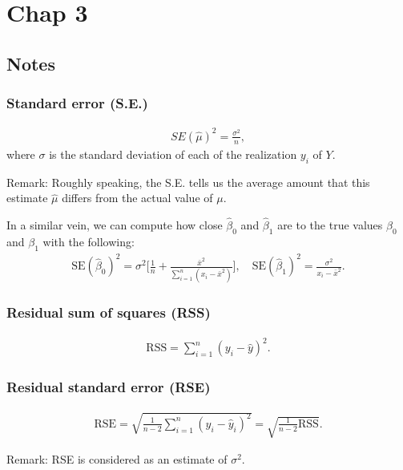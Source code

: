 \section{Chap 3}
\subsection{Notes}
\subsubsection{Standard error (S.E.)}
\begin{align}
SE(\hat{\mu})^2 = \frac{\sigma^2}{n},
\end{align}
where $\sigma$ is the standard deviation of each of the realization $y_i$ of $Y$. 
\begin{tbox}
Remark: Roughly speaking, the S.E. tells us the average amount that this estimate $\hat{\mu}$ differs from the actual value of $\mu$.
\end{tbox}
In a similar vein, we can compute how close $\hat{\beta}_0$ and $\hat{\beta}_1$ are to the true values $\beta_0$ and $\beta_1$ with the following:
\begin{align}
\text{SE}(\hat{\beta}_0)^2 = \sigma^2\bigg[\frac{1}{n} + \frac{\bar{x}^2}{\sum_{i=1}^n(x_i-\bar{x}^2)}\bigg],\quad \text{SE}(\hat{\beta}_1)^2 = \frac{\sigma^2}{x_i-\bar{x}^2}.
\end{align}
\subsubsection{Residual sum of squares (RSS)}
\begin{align}
\text{RSS} = \sum_{i=1}^n(y_i - \hat{y})^2.
\end{align}
\subsubsection{Residual standard error (RSE)}
\begin{align}
\text{RSE} = \sqrt{\frac{1}{n-2}\sum_{i=1}^n(y_i - \hat{y}_i)^2} = \sqrt{\frac{1}{n-2}\text{RSS}}.
\end{align}
\begin{tbox}
Remark: RSE is considered as an estimate of $\sigma^2$.
\end{tbox}
